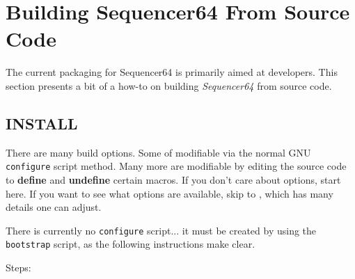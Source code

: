 %
%
%

\section{Building Sequencer64 From Source Code}
\label{sec:seq64_build}

   The current packaging for Sequencer64 is primarily aimed at developers.
   This section presents a bit of a how-to on building \textsl{Sequencer64}
   from source code.

\subsection{INSTALL}
\label{subsec:seq64_build_install}

   There are many build options.  Some of modifiable via the normal GNU
   \texttt{configure} script method.  Many more are modifiable by
   editing the source code to \textbf{define} and \textbf{undefine} certain
   macros.  If you don't care about options, start here.  If you want to
   see what options are available, skip to
   , which has many details one can
   adjust.

   There is currently no \texttt{configure} script... it must be created
   by using the \texttt{bootstrap} script, as the following instructions make
   clear.

Steps:

